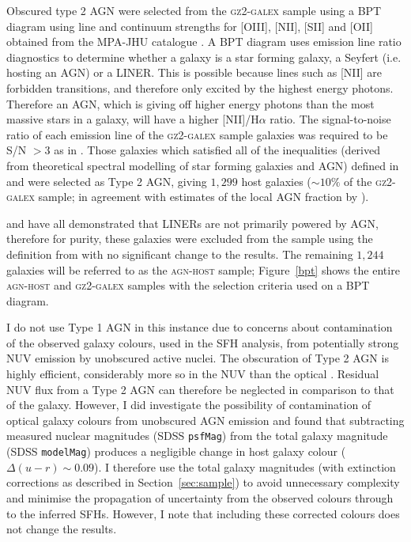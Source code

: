 Obscured type 2 AGN were selected from the \textsc{gz2-galex} sample using a BPT diagram \citep{bpt} using line and continuum strengths for [OIII], [NII], [SII] and [OII] obtained from the MPA-JHU catalogue \citep{kauffmann03, brinchmann04}. A BPT diagram uses emission line ratio diagnostics to determine whether a galaxy is a star forming galaxy, a Seyfert (i.e. hosting an AGN) or a LINER. This is possible because lines such as [NII] are forbidden transitions, and therefore only excited by the highest energy photons. Therefore an AGN, which is giving off higher energy photons than the most massive stars in a galaxy, will have a higher [NII]/H$\alpha$ ratio. The signal-to-noise ratio of each emission line of the \textsc{gz2-galex} sample galaxies was required to be S/N $> 3$ as in \cite{schawinski10a}. Those galaxies which satisfied all of the inequalities (derived from theoretical spectral modelling of star forming galaxies and AGN) defined in \citet[][to separate SF galaxies from AGN]{kewley01} and \citet[][to separate SF galaxies from composite SF-AGN galaxies]{kauffmann03b} were selected as Type 2 AGN, giving $1,299$ host galaxies ($\sim10\%$ of the \textsc{gz2-galex} sample; in agreement with estimates of the local AGN fraction by \citealt{kauffmann04, pimbblet13}).

\cite{Sarzi10, yan12} and \cite{Singh13} have all demonstrated that LINERs are not primarily powered by AGN, therefore for purity, these galaxies were excluded from the sample using the definition from \cite[][$55$ galaxies total]{kewley06} with no significant change to the results. The remaining $1,244$ galaxies will be referred to as the \textsc{agn-host} sample; Figure~\ref{bpt} shows the entire \textsc{agn-host} and \textsc{gz2-galex} samples with the selection criteria used on a BPT diagram.

I do not use Type 1 AGN in this instance due to concerns about contamination of the observed galaxy colours, used in the SFH analysis, from potentially strong NUV emission by unobscured active nuclei. The obscuration of Type 2 AGN is highly efficient, considerably more so in the NUV than the optical \citep{Simmons11}. Residual NUV flux from a Type 2 AGN can therefore be neglected in comparison to that of the galaxy. However, I did investigate the possibility of contamination of optical galaxy colours from unobscured AGN emission and found that subtracting measured nuclear magnitudes (SDSS {\tt psfMag}) from the total galaxy magnitude (SDSS {\tt modelMag}) produces a negligible change in host galaxy colour ($\Delta(u-r) \sim 0.09$). I therefore use the total galaxy magnitudes (with extinction corrections as described in Section~\ref{sec:sample}) to avoid unnecessary complexity and minimise the propagation of uncertainty from the observed colours through to the inferred SFHs. However, I note that including these corrected colours does not change the results.

